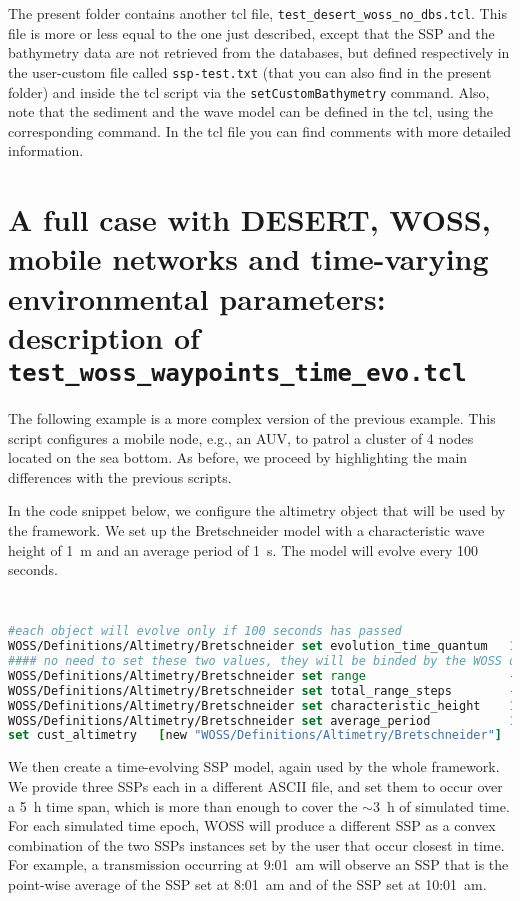 \documentclass[11pt]{article}
\begin{document}
The present folder contains another tcl file, {\tt test\_desert\_woss\_no\_dbs.tcl}. This file is more or less equal to the one just described, except that the SSP and the bathymetry data are not retrieved from the databases, but defined respectively in the user-custom file called {\tt ssp-test.txt} (that you can also find in the present folder) and inside the tcl script via the {\tt setCustomBathymetry} command. 
Also, note that the sediment and the wave model can be defined in the tcl, using the corresponding command. 
In the tcl file you can find comments with more detailed information.


\clearpage

\section{A full case with DESERT, WOSS, mobile networks and time-varying environmental parameters: description of\\ {\tt test\_woss\_waypoints\_time\_evo.tcl}}


The following example is a more complex version of the previous example. 
This script configures a mobile node, e.g., an AUV, to patrol a cluster of 4 nodes located 
on the sea bottom.
As before, we proceed by highlighting the main differences with the previous scripts.

In the code snippet below, we configure the altimetry object that will be used by the framework.
We set up the Bretschneider model with a characteristic wave height of 1~m and an average period of 1~s.
The model will evolve every 100 seconds.

{\scriptsize\tt
\begin{lstlisting}[language=tcl,showstringspaces=false]
#each object will evolve only if 100 seconds has passed
WOSS/Definitions/Altimetry/Bretschneider set evolution_time_quantum   100
#### no need to set these two values, they will be binded by the WOSS object
WOSS/Definitions/Altimetry/Bretschneider set range                    -1
WOSS/Definitions/Altimetry/Bretschneider set total_range_steps        -1
WOSS/Definitions/Altimetry/Bretschneider set characteristic_height    1.0
WOSS/Definitions/Altimetry/Bretschneider set average_period           1.0
set cust_altimetry   [new "WOSS/Definitions/Altimetry/Bretschneider"]
\end{lstlisting}
}
\vspace{\baselinestretch\baselineskip}

We then create a time-evolving SSP model, again used by the whole framework.
We provide three SSPs each in a different ASCII file, and set them to occur over a 5~h time span, which is more than enough to cover the $\sim$3~h of simulated time.
For each simulated time epoch, WOSS will produce a different SSP as a convex combination of the two SSPs instances set by the user that occur closest in time. For example, a transmission occurring at 9:01~am will observe an SSP that is the point-wise average of the SSP set at 8:01~am and of the SSP set at 10:01~am. 
\end{document}
